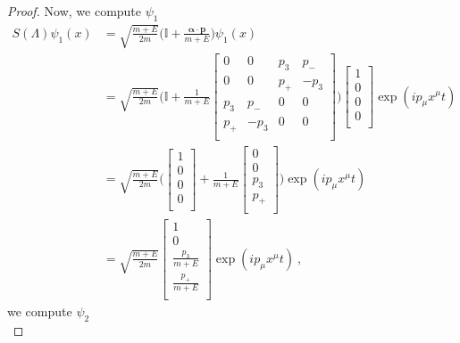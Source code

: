 \begin{proof}
        Now, we compute $\psi_1$ 
        \begin{equation*}
        \begin{aligned}
            S(\Lambda) \psi_1 (x) & = \sqrt{\frac{m + E}{2m}} \Big ( \mathbb I + \frac{\boldsymbol \alpha \cdot \mathbf p}{m + E}\Big) \psi_1 (x) \\ & = \sqrt{\frac{m + E}{2m}} \Big ( \mathbb I + \frac{1}{m + E} \begin{bmatrix}
                0 & 0 & p_3 & p_- \\
                0 & 0 & p_+ & - p_3 \\
                p_3 & p_- & 0 & 0 \\
                p_+ & -p_3 & 0 & 0 \\
            \end{bmatrix} \Big) \begin{bmatrix}
                1 \\ 0 \\ 0 \\ 0 \\
            \end{bmatrix} \exp(i p_\mu x^\mu t) \\ & = \sqrt{\frac{m + E}{2m}} \Big ( \begin{bmatrix}
                1 \\ 0 \\ 0 \\ 0 \\
            \end{bmatrix} + \frac{1}{m + E} \begin{bmatrix}
                0 \\ 0 \\ p_3 \\ p_+ \\
            \end{bmatrix} \Big) \exp(i p_\mu x^\mu t) \\ & = \sqrt{\frac{m + E}{2m}} \begin{bmatrix}
                1 \\ 0 \\ \frac{p_3}{m+E} \\ \frac{p_+}{m+E} \\
            \end{bmatrix} \exp(ip_\mu x^\mu t)  ~,
        \end{aligned}
        \end{equation*}
        we compute $\psi_2$ 
        \begin{equation*}

\end{equation*}
\end{proof}
